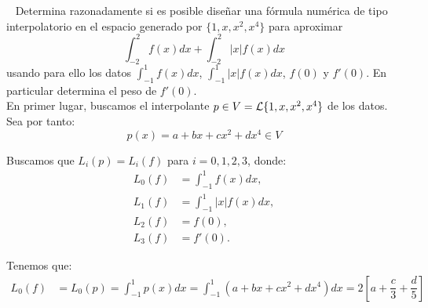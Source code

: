 \begin{ejercicio}~\label{ej:2.3.2}
    Determina razonadamente si es posible diseñar una fórmula numérica de tipo interpolatorio en el espacio generado por $\{1, x, x^2, x^4\}$ para aproximar
    \begin{equation*}
        \int_{-2}^{2} f(x) dx + \int_{-2}^{2} |x|f(x) dx
    \end{equation*}
    usando para ello los datos $\int_{-1}^{1} f(x) dx$, $\int_{-1}^{1} |x|f(x) dx$, $f(0)$ y $f'(0)$. En particular determina el peso de $f'(0)$.\\


    En primer lugar, buscamos el interpolante $p\in V=\mathcal{L}\{1,x,x^2,x^4\}$ de los datos. Sea por tanto:
    \begin{equation*}
        p(x)=a+bx+cx^2+dx^4\in V
    \end{equation*}

    Buscamos que $L_i(p)=L_i(f)$ para $i=0,1,2,3$, donde:
    \begin{align*}
        L_0(f) &= \int_{-1}^{1} f(x)dx,\\
        L_1(f) &= \int_{-1}^{1} |x|f(x)dx,\\
        L_2(f) &= f(0),\\
        L_3(f) &= f'(0).
    \end{align*}

    Tenemos que:
    \begin{align*}
        L_0(f) &= L_0(p) = \int_{-1}^{1} p(x)dx = \int_{-1}^{1} (a + bx + cx^2 + dx^4)dx = 2\left[a + \dfrac{c}{3} + \dfrac{d}{5}\right]
    \end{align*}
\end{ejercicio}

